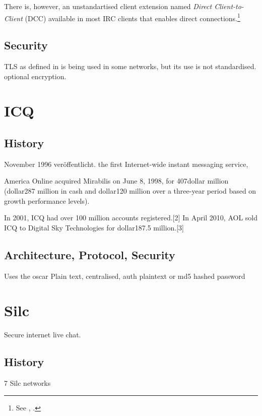 There is, however, an unstandartised client extension named 
\textit{Direct Client-to-Client} (DCC) available in most IRC clients
that enables direct connections.\footnote{See \cite{dcc}, \cite{dcc2}.}

\subsection{Security}
TLS as defined in \cite{rfc2246} is being used in some networks, 
but its use is not standardised.
optional encryption.
\section{ICQ}
\subsection{History}
November 1996 veröffentlicht.
 the first Internet-wide instant messaging service, 

America Online acquired Mirabilis on June 8, 1998, for 407dollar million (dollar287 million in cash and dollar120 million over a three-year period based on growth performance levels).

In 2001, ICQ had over 100 million accounts registered.[2] In April 2010, AOL sold ICQ to Digital Sky Technologies for dollar187.5 million.[3]

\subsection{Architecture, Protocol, Security}
Uses the oscar \cite{oscar}
Plain text, centralised, auth plaintext or md5 hashed password
\section{Silc}
Secure internet live chat.
\subsection{History}
7 Silc networks

